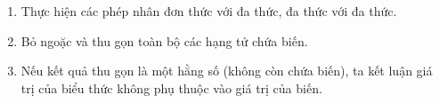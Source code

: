 \begin{enumerate}
\item Thực hiện các phép nhân đơn thức với đa thức, đa thức với đa thức.
\item Bỏ ngoặc và thu gọn toàn bộ các hạng tử chứa biến.
\item Nếu kết quả thu gọn là một hằng số (không còn chứa biến), ta kết luận giá trị của biểu thức không phụ thuộc vào giá trị của biến.
\end{enumerate}
